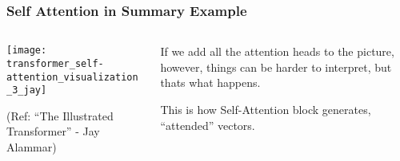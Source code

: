 \begin{frame}[fragile]\frametitle{Self Attention in Summary Example}

\begin{columns}
    \begin{column}[T]{0.5\linewidth}

\begin{center}
\texttt{[image: transformer\_self-attention\_visualization\_3\_jay]}


{\tiny (Ref: ``The Illustrated Transformer'' - Jay Alammar)}
\end{center}	
		\end{column}
    \begin{column}[T]{0.5\linewidth}
If we add all the attention heads to the picture, however, things can be harder to interpret, but thats what happens.

This is how Self-Attention block generates, ``attended'' vectors.
    \end{column}
  \end{columns}
\end{frame}


			
			



			
			



